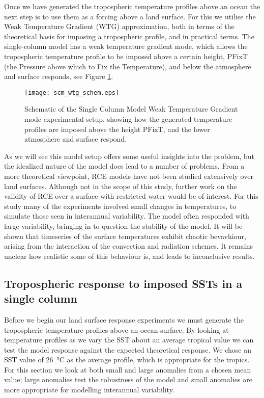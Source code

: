Once we have generated the tropospheric temperature profiles above an ocean the 
next step is to use them as a forcing above a land surface. For this we utilise 
the Weak Temperature Gradient (WTG) approximation, both in terms of the 
theoretical basis for imposing a tropospheric profile, and in practical terms.  
The single-column model has a weak temperature gradient mode, which allows the 
tropospheric temperature profile to be imposed above a certain height, PFixT 
(the Pressure above which to Fix the Temperature), and below the atmosphere and 
surface responds, see Figure \ref{fig:scmschem}.

\begin{figure}[ht]
\texttt{[image: scm\_wtg\_schem.eps]}
\caption{Schematic of the Single Column Model Weak Temperature Gradient mode 
experimental setup, showing how the generated temperature profiles are imposed 
above the height PFixT, and the lower atmosphere and surface respond.}
\label{fig:scmschem}
\end{figure}

As we will see this model setup offers some useful insights into the problem, 
but the idealized nature of the model does lead to a number of problems.  From a 
more theoretical viewpoint, RCE models have not been studied extensively over 
land surfaces. Although not in the scope of this study, further work on the 
validity of RCE over a surface with restricted water would be of interest. For 
this study many of the experiments involved small changes in temperatures, to 
simulate those seen in interannual variability.  The model often responded with 
large variability, bringing in to question the stability of the model. It will 
be shown that timeseries of the surface temperatures exhibit chaotic bevavhiour, 
arising from the interaction of the convection and radiation schemes. It remains 
unclear how realistic some of this behaviour is, and leads to inconclusive 
results.

\subsection{Tropospheric response to imposed SSTs in a single column}
\label{trop_response_ocean}

Before we begin our land surface response experiments we must generate the 
tropospheric temperature profiles above an ocean surface. By looking at 
temperature profiles as we vary the SST about an average tropical value we can 
test the model response against the expected theoretical response. We chose an 
SST value of \SI{26}{\degreeCelsius} as the average profile, which is 
appropriate for the tropics. For this section we look at both small and large 
anomalies from a chosen mean value; large anomalies test the robustness of the 
model and small anomalies are more appropriate for modelling interannual 
variability.

